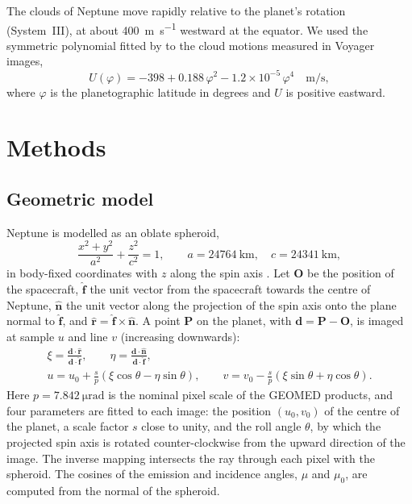 \documentclass[11pt,a4paper]{article}
\newcommand{\vect}[1]{\mathbf{#1}}
\newcommand{\unitv}[1]{\hat{\mathbf{#1}}}
\begin{document}
The clouds of Neptune move rapidly relative to the planet's rotation (System~III), at about
\SI{400}{\metre\per\second} westward at the equator. We used the symmetric polynomial fitted by
\citet{sromovsky1993} to the cloud motions measured in Voyager images,
\begin{equation}
U(\varphi) = -398 + 0.188\,\varphi^{2} - 1.2\times10^{-5}\,\varphi^{4}\quad\si{\metre\per\second},
\label{eq:wind}
\end{equation}
where $\varphi$ is the planetographic latitude in degrees and $U$ is positive eastward.

\section{Methods}\label{sec:methods}

\subsection{Geometric model}

Neptune is modelled as an oblate spheroid,
\begin{equation}
\frac{x^{2}+y^{2}}{a^{2}} + \frac{z^{2}}{c^{2}} = 1,
\qquad a = \SI{24764}{\kilo\metre},\quad c = \SI{24341}{\kilo\metre},
\label{eq:spheroid}
\end{equation}
in body-fixed coordinates with $z$ along the spin axis \citep{archinal2018}. Let $\vect{O}$ be the
position of the spacecraft, $\unitv{f}$ the unit vector from the spacecraft towards the centre of
Neptune, $\unitv{n}$ the unit vector along the projection of the spin axis onto the plane normal
to $\unitv{f}$, and $\unitv{r} = \unitv{f}\times\unitv{n}$. A point $\vect{P}$ on the planet, with
$\vect{d} = \vect{P} - \vect{O}$, is imaged at sample $u$ and line $v$ (increasing downwards):
\begin{gather}
\xi = \frac{\vect{d}\cdot\unitv{r}}{\vect{d}\cdot\unitv{f}}, \qquad
\eta = \frac{\vect{d}\cdot\unitv{n}}{\vect{d}\cdot\unitv{f}},
\label{eq:tangent}\\
u = u_{0} + \frac{s}{p}\left(\xi\cos\theta - \eta\sin\theta\right), \qquad
v = v_{0} - \frac{s}{p}\left(\xi\sin\theta + \eta\cos\theta\right).
\label{eq:camera}
\end{gather}
Here $p = \SI{7.842}{\micro\radian}$ is the nominal pixel scale of the GEOMED products, and four
parameters are fitted to each image: the position $(u_{0}, v_{0})$ of the centre of the planet, a
scale factor $s$ close to unity, and the roll angle $\theta$, by which the projected spin axis is
rotated counter-clockwise from the upward direction of the image. The inverse mapping intersects
the ray through each pixel with the spheroid. The cosines of the emission and incidence angles,
$\mu$ and $\mu_{0}$, are computed from the normal of the spheroid.
\end{document}
